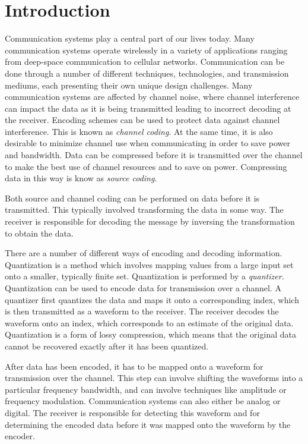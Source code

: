 \documentclass[10pt]{article}
\begin{document}
\section{Introduction}
Communication systems play a central part of our lives today. Many communication systems operate wirelessly in a variety of applications ranging from deep-space communication to cellular networks. Communication can be done through a number of different techniques, technologies, and transmission mediums, each presenting their own unique design challenges. Many communication systems are affected by channel noise, where channel interference can impact the data as it is being transmitted leading to incorrect decoding at the receiver. Encoding schemes can be used to protect data against channel interference. This is known as \emph{channel coding}. At the same time, it is also desirable to minimize channel use when communicating in order to save power and bandwidth. Data can be compressed before it is transmitted over the channel to make the best use of channel resources and to save on power. Compressing data in this way is know as \emph{source coding}.

Both source and channel coding can be performed on data before it is transmitted. This typically involved transforming the data in some way. The receiver is responsible for decoding the message by inversing the transformation to obtain the data.

There are a number of different ways of encoding and decoding information. Quantization is a method which involves mapping values from a large input set onto a smaller, typically finite set. Quantization is performed by a \emph{quantizer}. Quantization can be used to encode data for transmission over a channel. A quantizer first quantizes the data and maps it onto a corresponding index, which is then transmitted as a waveform to the receiver. The receiver decodes the waveform onto an index, which corresponds to an estimate of the original data. Quantization is a form of lossy compression, which means that the original data cannot be recovered exactly after it has been quantized.

After data has been encoded, it has to be mapped onto a waveform for transmission over the channel. This step can involve shifting the waveforms into a particular frequency bandwidth, and can involve techniques like amplitude or frequency modulation. Communication systems can also either be analog or digital. The receiver is responsible for detecting this waveform and for determining the encoded data before it was mapped onto the waveform by the encoder.
\end{document}
